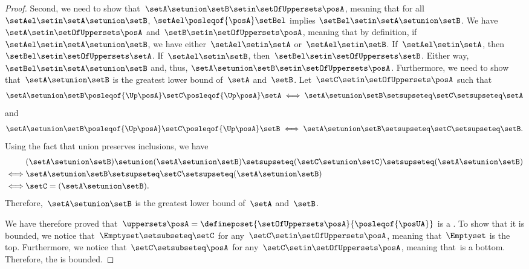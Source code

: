 \begin{proof}
    Second, we need to show that~$\setA\setunion \setB\setin \setOfUppersets \posA$, meaning that for all $\setAel \setin \setA\setunion\setB$, $\setAel \posleqof{\posA} \setBel$ implies $\setBel \setin \setA\setunion\setB$.
    We have~$\setA \setin \setOfUppersets \posA$ and~$\setB \setin \setOfUppersets \posA$, meaning that by definition, if~$\setAel\setin \setA\setunion \setB$, we have either~$\setAel\setin \setA$ or~$\setAel\setin \setB$.
    If~$\setAel\setin \setA$, then~$\setBel\setin \setOfUppersets \setA$.
    If~$\setAel\setin \setB$, then~$\setBel \setin \setOfUppersets \setB$. Either way, $\setBel \setin \setA\setunion\setB$ and, thus, $\setA \setunion \setB \setin \setOfUppersets\posA$.
    Furthermore, we need to show that~$\setA\setunion \setB$ is the greatest lower bound of~$\setA$ and~$\setB$.
    Let~$\setC\setin \setOfUppersets \posA$ such that
\[
\setA\setunion \setB\posleqof{\Up \posA} \setC \posleqof{\Up \posA} \setA
\iff    
\setA\setunion \setB\setsupseteq \setC\setsupseteq \setA
\]
and
\[
\setA\setunion \setB\posleqof{\Up \posA} \setC \posleqof{\Up \posA} \setB
\iff    
\setA\setunion \setB\setsupseteq \setC\setsupseteq \setB.
\]
    Using the fact that union preserves inclusions, we have
    \begin{equation*}
        \begin{aligned}
            &(\setA\setunion \setB)
            \setunion (\setA\setunion \setB)  \setsupseteq (\setC \setunion \setC) \setsupseteq (\setA\setunion \setB) \\
            \iff&\setA\setunion \setB              \setsupseteq \setC\setsupseteq (\setA\setunion \setB ) \\
            \iff&\setC                             =(\setA\setunion \setB).
        \end{aligned}
    \end{equation*}
    Therefore,~$\setA\setunion \setB$ is the greatest lower bound of~$\setA$ and~$\setB$.

    We have therefore proved that~$\uppersets \posA=\defineposet{\setOfUppersets \posA}{\posleqof{\posUA}}$ is a .
    To show that it is bounded, we notice that~$\Emptyset \setsubseteq \setC$ for any~$\setC\setin \setOfUppersets \posA$, meaning that~$\Emptyset$ is the top.
    Furthermore, we notice that~$\setC\setsubseteq \posA$ for any~$\setC\setin \setOfUppersets \posA$, meaning that~\posA is a bottom.
    Therefore, the  is bounded.
\end{proof}

